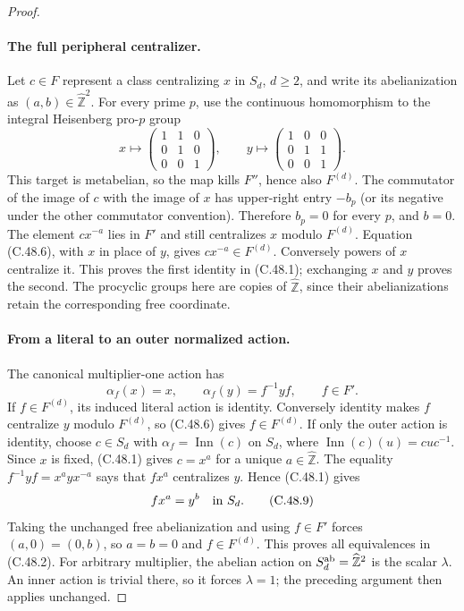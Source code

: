 \begin{proof}
\paragraph{The full peripheral centralizer.}
Let $c\in F$ represent a class centralizing $x$ in $S_d$, $d\geq2$,
and write its abelianization as $(a,b)\in\widehat{\mathbb Z}^2$.
For every prime $p$, use the continuous homomorphism to the integral
Heisenberg pro-$p$ group
\[
 x\longmapsto
 \begin{pmatrix}1&1&0\\0&1&0\\0&0&1\end{pmatrix},\qquad
 y\longmapsto
 \begin{pmatrix}1&0&0\\0&1&1\\0&0&1\end{pmatrix}.       \tag{C.48.7}
\]
This target is metabelian, so the map kills $F''$, hence also
$F^{(d)}$. The commutator of the image of $c$ with the image of
$x$ has upper-right entry $-b_p$ (or its negative under the other
commutator convention). Therefore $b_p=0$ for every $p$, and $b=0$.
The element $c x^{-a}$ lies in $F'$ and still centralizes $x$
modulo $F^{(d)}$. Equation (C.48.6), with $x$ in place of $y$,
gives $c x^{-a}\in F^{(d)}$.
Conversely powers of $x$ centralize it. This proves the first
identity in (C.48.1); exchanging $x$ and $y$ proves the second.
The procyclic groups here are copies of $\widehat{\mathbb Z}$,
since their abelianizations retain the corresponding free coordinate.

\paragraph{From a literal to an outer normalized action.}
The canonical multiplier-one action has
\[
              \alpha_f(x)=x,\qquad
              \alpha_f(y)=f^{-1}yf,
              \qquad f\in F'.                         \tag{C.48.8}
\]
If $f\in F^{(d)}$, its induced literal action is identity.
Conversely identity makes $f$ centralize $y$ modulo $F^{(d)}$,
so (C.48.6) gives $f\in F^{(d)}$.
If only the outer action is identity, choose $c\in S_d$ with
$\alpha_f=\operatorname{Inn}(c)$ on $S_d$, where
$\operatorname{Inn}(c)(u)=cuc^{-1}$.
Since $x$ is fixed, (C.48.1) gives $c=x^a$ for a unique
$a\in\widehat{\mathbb Z}$.
The equality $f^{-1}yf=x^a yx^{-a}$ says that $f x^a$
centralizes $y$. Hence (C.48.1) gives
\[
                        f x^a=y^b\quad\hbox{in }S_d.  \tag{C.48.9}
\]
Taking the unchanged free abelianization and using $f\in F'$
forces $(a,0)=(0,b)$, so $a=b=0$ and $f\in F^{(d)}$.
This proves all equivalences in (C.48.2). For arbitrary multiplier,
the abelian action on $S_d^{\rm ab}=\widehat{\mathbb Z}^2$
is the scalar $\lambda$. An inner action is trivial there, so it
forces $\lambda=1$; the preceding argument then applies unchanged.


\end{proof}
